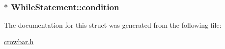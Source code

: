 \subsubsection[{condition}]{$\ast$ While\+Statement\+::condition}\label{struct_while_statement_af0f54d7883033e8be83f790afefbae75}


The documentation for this struct was generated from the following file\+:\begin{DoxyCompactItemize}
\item 
\hyperlink{crowbar_8h}{crowbar.\+h}\end{DoxyCompactItemize}

